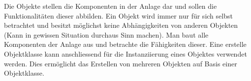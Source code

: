 Die Objekte stellen die Komponenten in der Anlage dar und sollen die Funktionalitäten dieser abbilden. Ein Objekt wird immer nur für sich selbst betrachtet und besitzt möglichst keine Abhängigkeiten von anderen Objekten (Kann in gewissen Situation durchaus Sinn machen). Man baut alle Komponenten der Anlage aus und betrachte die Fähigkeiten dieser. Eine erstelle Objektklasse kann anschliessend für die Instanziierung eines Objektes verwendet werden. Dies ermöglicht das Erstellen von mehreren Objekten auf Basis einer Objektklasse. 